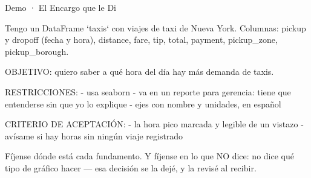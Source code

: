 \documentclass[aspectratio=169, 11pt]{beamer}
\begin{document}
\begin{frame}[shrink=5]{Demo · El Encargo que le Di}
  \vspace{2pt}
  \begin{prompt}
Tengo un DataFrame `taxis` con viajes de
taxi de Nueva York. Columnas: pickup y dropoff (fecha
y hora), distance, fare, tip, total, payment,
pickup_zone, pickup_borough.

OBJETIVO: quiero saber a qué hora del día hay más
demanda de taxis.

RESTRICCIONES:
- usa seaborn
- va en un reporte para gerencia: tiene que
  entenderse sin que yo lo explique
- ejes con nombre y unidades, en español

CRITERIO DE ACEPTACIÓN:
- la hora pico marcada y legible de un vistazo
- avísame si hay horas sin ningún viaje registrado
  \end{prompt}
  \vspace{4pt}
  {\scriptsize\color{textMuted}
   Fíjense dónde está cada fundamento. Y fíjense en lo que NO dice: no dice
   qué tipo de gráfico hacer --- esa decisión se la dejé, y la revisé al
   recibir.}
\end{frame}
\end{document}
